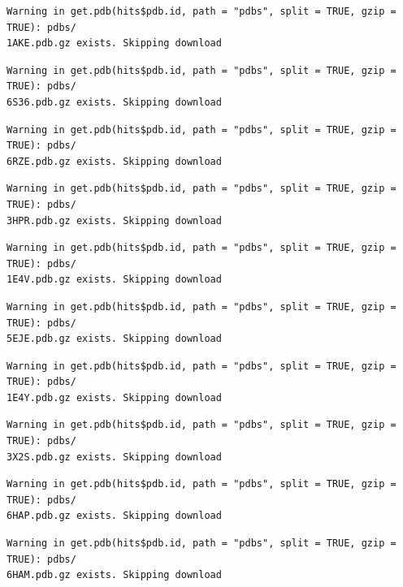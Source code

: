 \documentclass[
  letterpaper,
  DIV=11,
  numbers=noendperiod]{scrartcl}
\begin{document}
\begin{verbatim}
Warning in get.pdb(hits$pdb.id, path = "pdbs", split = TRUE, gzip = TRUE): pdbs/
1AKE.pdb.gz exists. Skipping download
\end{verbatim}

\begin{verbatim}
Warning in get.pdb(hits$pdb.id, path = "pdbs", split = TRUE, gzip = TRUE): pdbs/
6S36.pdb.gz exists. Skipping download
\end{verbatim}

\begin{verbatim}
Warning in get.pdb(hits$pdb.id, path = "pdbs", split = TRUE, gzip = TRUE): pdbs/
6RZE.pdb.gz exists. Skipping download
\end{verbatim}

\begin{verbatim}
Warning in get.pdb(hits$pdb.id, path = "pdbs", split = TRUE, gzip = TRUE): pdbs/
3HPR.pdb.gz exists. Skipping download
\end{verbatim}

\begin{verbatim}
Warning in get.pdb(hits$pdb.id, path = "pdbs", split = TRUE, gzip = TRUE): pdbs/
1E4V.pdb.gz exists. Skipping download
\end{verbatim}

\begin{verbatim}
Warning in get.pdb(hits$pdb.id, path = "pdbs", split = TRUE, gzip = TRUE): pdbs/
5EJE.pdb.gz exists. Skipping download
\end{verbatim}

\begin{verbatim}
Warning in get.pdb(hits$pdb.id, path = "pdbs", split = TRUE, gzip = TRUE): pdbs/
1E4Y.pdb.gz exists. Skipping download
\end{verbatim}

\begin{verbatim}
Warning in get.pdb(hits$pdb.id, path = "pdbs", split = TRUE, gzip = TRUE): pdbs/
3X2S.pdb.gz exists. Skipping download
\end{verbatim}

\begin{verbatim}
Warning in get.pdb(hits$pdb.id, path = "pdbs", split = TRUE, gzip = TRUE): pdbs/
6HAP.pdb.gz exists. Skipping download
\end{verbatim}

\begin{verbatim}
Warning in get.pdb(hits$pdb.id, path = "pdbs", split = TRUE, gzip = TRUE): pdbs/
6HAM.pdb.gz exists. Skipping download
\end{verbatim}
\end{document}

